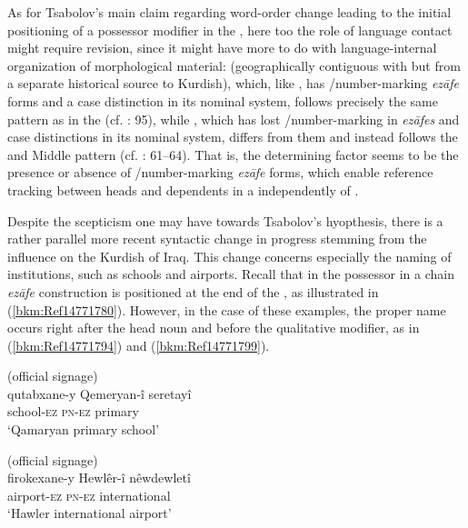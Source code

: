 \documentclass[output=paper]{langsci/langscibook}
\begin{document}
As for Tsabolov’s main claim regarding word-order change leading to the initial positioning of a possessor modifier in the , here too the role of language contact might require revision, since it might have more to do with language-internal organization of morphological material:  (geographically contiguous with  but from a separate historical source to Kurdish), which, like , has /number-marking \textit{ezāfe} forms and a case distinction in its nominal system, follows precisely the same  pattern as  in the  (cf. \citealt{Todd2002}: 95), while , which has lost /number-marking in \textit{ezāfes} and case distinctions in its nominal system, differs from them and instead follows the  and Middle  pattern (cf. \citealt{Öpengin2016}: 61–64). That is, the determining factor seems to be the presence or absence of /number-marking \textit{ezāfe} forms, which enable reference tracking between heads and dependents in a  independently of .   

Despite the scepticism one may have towards Tsabolov’s hyopthesis, there is a rather parallel more recent syntactic change in progress stemming from the  influence on the Kurdish of Iraq. This change concerns especially the naming of institutions, such as schools and airports. Recall that in  the possessor in a chain \textit{ezāfe} construction is positioned at the end of the , as illustrated in (\ref{bkm:Ref14771780}). However, in the case of these examples, the proper name occurs right after the head noun and before the qualitative modifier, as in (\ref{bkm:Ref14771794}) and (\ref{bkm:Ref14771799}). 

\ea\label{bkm:Ref14771794} (official signage)\\
\gll qutabxane-y Qemeryan-î seretayî\\
     school-\textsc{ez} \textsc{pn-ez} primary\\
\glt ‘Qamaryan primary school’
\z

\ea\label{bkm:Ref14771799} (official signage)\\
\gll firokexane-y Hewlêr-î nêwdewletî\\
     airport-\textsc{ez} \textsc{pn-ez} international\\
\glt ‘Hawler international airport’
\z
\end{document}
